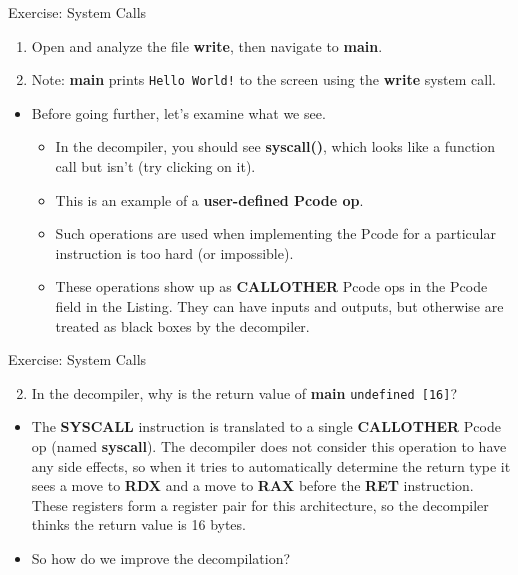 \documentclass{beamer}
\begin{document}
\begin{frame}
\begin{block}{Exercise: System Calls}
\begin{enumerate}
\item Open and analyze the file \textbf{write}, then navigate to \textbf{main}.
\item[] Note: \textbf{main} prints \texttt{Hello World!} to the screen using the \textbf{write} system call.
\end{enumerate}
\begin{itemize}
\item Before going further, let's examine what we see.
\begin{itemize}
\item In the decompiler, you should see \textbf{syscall()}, which looks like a function call but isn't (try clicking on it).
\item This is an example of a \textbf{user-defined Pcode op}.
\item Such operations are used when implementing the Pcode for a particular instruction is too hard (or impossible).
\item These operations show up as \textbf{CALLOTHER} Pcode ops in the Pcode field in the Listing.  They can have inputs and outputs, but otherwise are treated
as black boxes by the decompiler.
\end{itemize}
\end{itemize}
\end{block}
\end{frame}

\begin{frame}
\begin{block}{Exercise: System Calls}
\begin{enumerate}
\setcounter{enumi}{1}
\item In the decompiler, why is the return value of \textbf{main} \texttt{undefined [16]}?
\end{enumerate}
\pause
\begin{itemize}
\item The \textbf{SYSCALL} instruction is translated to a single \textbf{CALLOTHER} Pcode op (named \textbf{syscall}).  The decompiler does not consider this operation to have any
side effects, so when it tries to automatically determine the return type it sees a move to \textbf{RDX} and a move to \textbf{RAX} before the \textbf{RET} instruction.
These registers form a register pair for this architecture, so the decompiler thinks the return value is 16 bytes.
\item So how do we improve the decompilation?
\end{itemize}
\end{block}
\end{frame}
\end{document}
